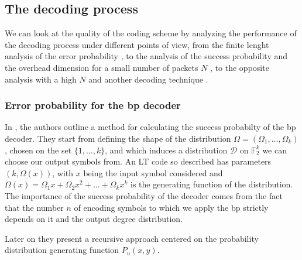 \subsection{The decoding process}
We can look at the quality of the coding scheme by analyzing the performance of the decoding process under different points of view, from the finite lenght analysis of the error probability \cite{Karp2004}, to the analysis of the success probability and the overhead dimension for a small number of packets $N$ \cite{Hyytia2007}, to the opposite analysis with a high $N$ and another decoding technique \cite{Lu}.

\subsubsection{Error probability for the \gls{bp} decoder}
In \cite{Karp2004}, the authors outline a method for calculating the success probabilty of the \gls{bp} decoder. They start from defining the shape of the distribution $\Omega = (\Omega_1,\dots,\Omega_k)$, chosen on the set $\{1,\dots,k\}$, and which induces a distribution $\mathcal{D}$ on $\mathbb{F}_2^k$ we can choose our output symbols from. An LT code so described has parameters $(k,\Omega(x))$, with $x$ being the input symbol considered and $\Omega(x) = \Omega_1x+\Omega_2x^2+\dots+\Omega_kx^k$ is the generating function of the distribution. The importance of the success probability of the decoder comes from the fact that the number $n$ of encoding symbols to which we apply the \gls{bp} strictly depends on it and the output degree distribution.

Later on they present a recursive approach centered on the probability distribution generating function $P_u(x,y)$.





